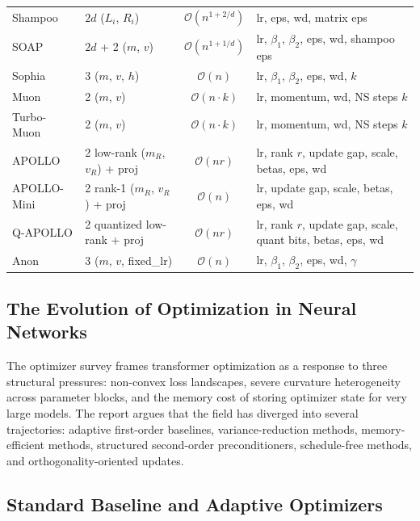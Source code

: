 \begin{longtable}{llcl}
Shampoo & $2d$ ($L_i$, $R_i$) & $\mathcal{O}(n^{1+2/d})$ & lr, eps, wd, matrix eps \\
SOAP & $2d$ + 2 ($m$, $v$) & $\mathcal{O}(n^{1+1/d})$ & lr, $\beta_1$, $\beta_2$, eps, wd, shampoo eps \\
Sophia & 3 ($m$, $v$, $h$) & $\mathcal{O}(n)$ & lr, $\beta_1$, $\beta_2$, eps, wd, $k$ \\
Muon & 2 ($m$, $v$) & $\mathcal{O}(n \cdot k)$ & lr, momentum, wd, NS steps $k$ \\
Turbo-Muon & 2 ($m$, $v$) & $\mathcal{O}(n \cdot k)$ & lr, momentum, wd, NS steps $k$ \\
APOLLO & 2 low-rank ($m_R$, $v_R$) + proj & $\mathcal{O}(nr)$ & lr, rank $r$, update gap, scale, betas, eps, wd \\
APOLLO-Mini & 2 rank-1 ($m_R$, $v_R$) + proj & $\mathcal{O}(n)$ & lr, update gap, scale, betas, eps, wd \\
Q-APOLLO & 2 quantized low-rank + proj & $\mathcal{O}(nr)$ & lr, rank $r$, update gap, scale, quant bits, betas, eps, wd \\
Anon & 3 ($m$, $v$, fixed\_lr) & $\mathcal{O}(n)$ & lr, $\beta_1$, $\beta_2$, eps, wd, $\gamma$ \\
\end{longtable}

\subsection{The Evolution of Optimization in Neural Networks}
The optimizer survey frames transformer optimization as a response to three structural pressures: non-convex loss landscapes, severe curvature heterogeneity across parameter blocks, and the memory cost of storing optimizer state for very large models. The report argues that the field has diverged into several trajectories: adaptive first-order baselines, variance-reduction methods, memory-efficient methods, structured second-order preconditioners, schedule-free methods, and orthogonality-oriented updates.

\subsection{Standard Baseline and Adaptive Optimizers}
